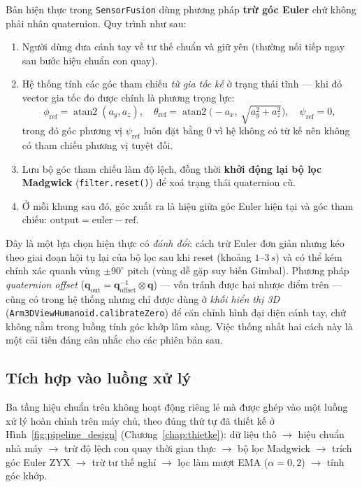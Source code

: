 \documentclass[../DoAn.tex]{subfiles}
\begin{document}
Bản hiện thực trong \texttt{SensorFusion} dùng phương pháp \textbf{trừ góc Euler} chứ không phải nhân quaternion. Quy trình như sau:
\begin{enumerate}
    \item Người dùng đưa cánh tay về tư thế chuẩn và giữ yên (thường nối tiếp ngay sau bước hiệu chuẩn con quay).
    \item Hệ thống tính các góc tham chiếu \emph{từ gia tốc kế} ở trạng thái tĩnh --- khi đó vector gia tốc đo được chính là phương trọng lực:
          \begin{equation}
              \phi_{\mathrm{ref}} = \operatorname{atan2}(a_y, a_z), \quad \theta_{\mathrm{ref}} = \operatorname{atan2}\!\big(-a_x,\ \sqrt{a_y^2 + a_z^2}\big), \quad \psi_{\mathrm{ref}} = 0,
              \label{eq:zeroref}
          \end{equation}
          trong đó góc phương vị $\psi_{\mathrm{ref}}$ luôn đặt bằng $0$ vì hệ không có từ kế nên không có tham chiếu phương vị tuyệt đối.
    \item Lưu bộ góc tham chiếu làm độ lệch, đồng thời \textbf{khởi động lại bộ lọc Madgwick} (\texttt{filter.reset()}) để xoá trạng thái quaternion cũ.
    \item Ở mỗi khung sau đó, góc xuất ra là hiệu giữa góc Euler hiện tại và góc tham chiếu: $\text{output} = \text{euler} - \text{ref}$.
\end{enumerate}

Đây là một lựa chọn hiện thực có \emph{đánh đổi}: cách trừ Euler đơn giản nhưng kéo theo giai đoạn hội tụ lại của bộ lọc sau khi reset (khoảng $1$--$3\,\si{s}$) và có thể kém chính xác quanh vùng $\pm 90^{\circ}$ pitch (vùng dễ gặp suy biến Gimbal). Phương pháp \emph{quaternion offset} ($\mathbf{q}_{\mathrm{out}} = \mathbf{q}_{\mathrm{offset}}^{-1}\otimes\mathbf{q}$) --- vốn tránh được hai nhược điểm trên --- cũng có trong hệ thống nhưng chỉ được dùng ở \emph{khối hiển thị 3D} (\texttt{Arm3DViewHumanoid.calibrateZero}) để căn chỉnh hình đại diện cánh tay, chứ không nằm trong luồng tính góc khớp lâm sàng. Việc thống nhất hai cách này là một cải tiến đáng cân nhắc cho các phiên bản sau.

\subsection{Tích hợp vào luồng xử lý}
\label{subsec:impl_pipeline}
Ba tầng hiệu chuẩn trên không hoạt động riêng lẻ mà được ghép vào một luồng xử lý hoàn chỉnh trên máy chủ, theo đúng thứ tự đã thiết kế ở Hình~\ref{fig:pipeline_design} (Chương~\ref{chap:thietke}): dữ liệu thô $\to$ hiệu chuẩn nhà máy $\to$ trừ độ lệch con quay thời gian thực $\to$ bộ lọc Madgwick $\to$ trích góc Euler ZYX $\to$ trừ tư thế nghỉ $\to$ lọc làm mượt EMA ($\alpha = 0{,}2$) $\to$ tính góc khớp.
\end{document}
